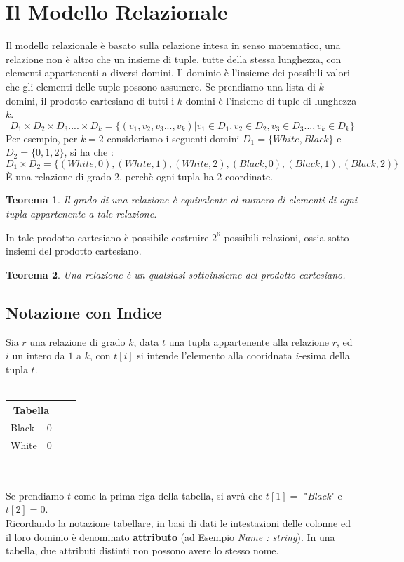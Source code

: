 \documentclass[12pt, letterpaper]{article}
\begin{document}
\section{Il Modello Relazionale}
Il modello relazionale è basato sulla relazione intesa in senso matematico, una relazione non è altro che un
insieme di tuple, tutte della stessa lunghezza, con elementi appartenenti a diversi domini. Il dominio è 
l'insieme dei possibili valori che gli elementi delle tuple possono assumere. Se prendiamo una lista di \(k\) domini,
il prodotto cartesiano di tutti i \(k\) domini è l'insieme di tuple di lunghezza \(k\).
\begin{equation}
    D_1 \times D_2 \times D_3....\times D_k = \{(v_1,v_2,v_3...,v_k)|v_1\in D_1,v_2\in D_2,v_3\in D_3...,v_k\in D_k\}
\end{equation}
Per esempio, per \(k=2\) consideriamo i seguenti domini \(D_1=\{White,Black\}\) e \(D_2=\{0,1,2\}\), si ha che :
\begin{equation}
    D_1\times D_2 = \{(White,0),(White,1),(White,2),(Black,0),(Black,1),(Black,2)\}
\end{equation}
È una relazione di grado 2, perchè ogni tupla ha 2 coordinate.
\newtheorem{theorem}{Teorema}
\begin{theorem}
    Il grado di una relazione è equivalente al numero di elementi di ogni tupla appartenente a tale relazione.
    \end{theorem}
In tale prodotto cartesiano è possibile costruire \(2^6\) possibili relazioni, ossia sotto-insiemi del
prodotto cartesiano.
\begin{theorem}
    Una relazione è un qualsiasi sottoinsieme del prodotto cartesiano.
\end{theorem}
\subsection{Notazione con Indice}\label{notConInd}
Sia \(r\) una relazione di grado \(k\), data \(t\) una tupla appartenente alla 
relazione \(r\), ed \(i\) un intero da \(1\) a \(k\), con \(t[i]\) si intende l'elemento
alla cooridnata \(i\)-esima della tupla \(t\).
\\
\hphantom{.}\\
\centering
\begin{tabular}{|l|l|l|r|}
    \hline
\multicolumn{2}{|c|}{\textbf{Tabella}}\\
    \hline
    Black & 0 \\
    \hline
    White & 0 \\
    \hline
    \end{tabular}\\
    \raggedright
Se prendiamo \(t\) come la prima riga della tabella, si avrà che \(t[1]=\)
"\textit{Black}" e  \(t[2]=0\).\\
Ricordando la notazione tabellare, in basi di dati le intestazioni delle colonne ed il loro dominio
è denominato \textbf{attributo} (ad Esempio \textit{Name : string}).
In una tabella, due attributi distinti non possono avere lo stesso nome.\\
\end{document}
